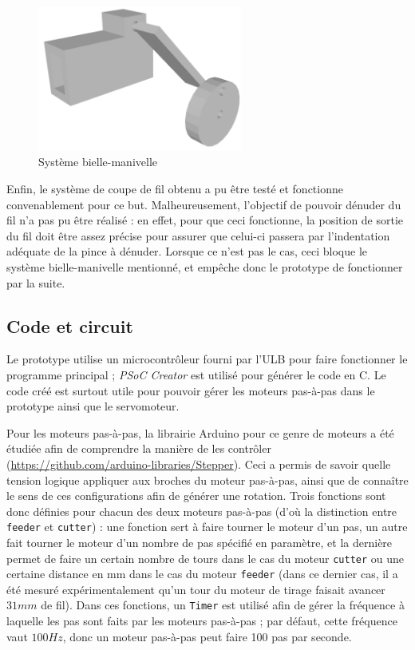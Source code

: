 \begin{figure}[H]
    \centering
    \includegraphics[width=0.6\textwidth]{images/3Dbiellemanivelle.png}
    \caption{Système bielle-manivelle}
    \label{fig:biellemanivelle}
\end{figure}

\par Enfin, le système de coupe de fil obtenu a pu être testé et fonctionne convenablement pour ce but. Malheureusement, l'objectif de pouvoir dénuder du fil n'a pas pu être réalisé : en effet, pour que ceci fonctionne, la position de sortie du fil doit être assez précise pour assurer que celui-ci passera par l'indentation adéquate de la pince à dénuder. Lorsque ce n'est pas le cas, ceci bloque le système bielle-manivelle mentionné, et empêche donc le prototype de fonctionner par la suite.


\subsection{Code et circuit}

\par Le prototype utilise un microcontrôleur fourni par l'ULB pour faire fonctionner le programme principal ; \textit{PSoC Creator} est utilisé pour générer le code en C. Le code créé est surtout utile pour pouvoir gérer les moteurs pas-à-pas dans le prototype ainsi que le servomoteur.

\par Pour les moteurs pas-à-pas, la librairie Arduino pour ce genre de moteurs a été étudiée afin de comprendre la manière de les contrôler (\url{https://github.com/arduino-libraries/Stepper}). Ceci a permis de savoir quelle tension logique appliquer aux broches du moteur pas-à-pas, ainsi que de connaître le sens de ces configurations afin de générer une rotation. Trois fonctions sont donc définies pour chacun des deux moteurs pas-à-pas (d'où la distinction entre \verb|feeder| et \verb|cutter|) : une fonction sert à faire tourner le moteur d'un pas, un autre fait tourner le moteur d'un nombre de pas spécifié en paramètre, et la dernière permet de faire un certain nombre de tours dans le cas du moteur \verb|cutter| ou une certaine distance en mm dans le cas du moteur \verb|feeder| (dans ce dernier cas, il a été mesuré expérimentalement qu'un tour du moteur de tirage faisait avancer $31 mm$ de fil). Dans ces fonctions, un \verb|Timer| est utilisé afin de gérer la fréquence à laquelle les pas sont faits par les moteurs pas-à-pas ; par défaut, cette fréquence vaut $100 Hz$, donc un moteur pas-à-pas peut faire 100 pas par seconde. 

